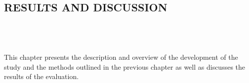 \begin{doublespace}
	\singlespacing
	\begin{center}
		\section{\textbf{RESULTS AND DISCUSSION}}
	\end{center}
	\leavevmode\\
	\leavevmode\\
	\leavevmode\\

	\doublespacing
	\justifying
	This chapter presents the description and overview of the development of
	the study and the methods outlined in the previous chapter as well as
	discusses the results of the evaluation.

	
	
	

\end{doublespace}
